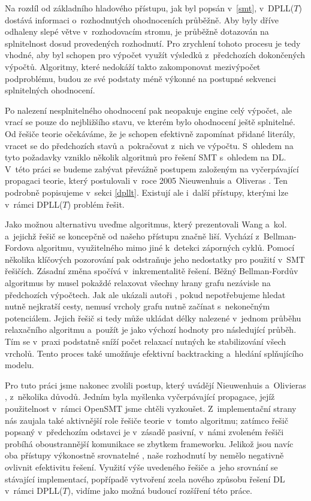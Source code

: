 Na rozdíl od základního hladového přístupu, jak byl popsán v~\ref{smt}, v~DPLL($T$) dostává \Solver informaci o~rozhodnutých ohodnoceních průběžně. Aby byly dříve odhaleny slepé větve v~rozhodovacím stromu, \Solver je průběžně dotazován na splnitelnost dosud provedených rozhodnutí. Pro zrychlení tohoto procesu je tedy vhodné, aby byl schopen pro výpočet využít výsledků z~předchozích dokončených výpočtů. Algoritmy, které nedokáží takto zakomponovat mezivýpočet podproblému, budou ze své podstaty méně výkonné na postupné sekvenci splnitelných ohodnocení.

Po nalezení nesplnitelného ohodnocení pak neopakuje engine celý výpočet, ale vrací se pouze do nejbližšího stavu, ve kterém bylo ohodnocení ještě splnitelné. Od řešiče teorie očekáváme, že je schopen efektivně zapomínat přidané literály, vracet se do předchozích stavů a~pokračovat z~nich ve výpočtu. %
S~ohledem na tyto požadavky vzniklo několik algoritmů pro řešení SMT s~ohledem na DL. V~této práci se budeme zabývat převážně postupem založeným na vyčerpávající propagaci teorie, který postulovali v~roce 2005 Nieuwenhuis a~Oliveras \cite{Nieuwenhuis05}. Ten podrobně popisujeme v~sekci \ref{dpllt}. Existují ale i~další přístupy, kterými lze v~rámci DPLL($T$) problém řešit.

Jako možnou alternativu uveďme algoritmus, který prezentovali Wang a~kol. \cite{Wang05} a~jejichž řešič se koncepčně od našeho přístupu značně liší. Vychází z~Bellman-Fordova algoritmu, využitelného mimo jiné k~detekci záporných cyklů. Pomocí několika klíčových pozorování pak odstraňuje jeho nedostatky pro použití v~SMT řešičích. Zásadní změna spočívá v~inkrementalitě řešení. Běžný Bellman-Fordův algoritmus by musel pokaždé relaxovat všechny hrany grafu nezávisle na předchozích výpočtech. Jak ale ukázali autoři \cite{Wang05}, pokud nepotřebujeme hledat nutně nejkratší cesty, nemusí vrcholy grafu nutně začínat s~nekonečným potenciálem. Jejich řešič si tedy může ukládat délky nalezené v~jednom průběhu relaxačního algoritmu a~použít je jako výchozí hodnoty pro následující průběh. Tím se v~praxi podstatně sníží počet relaxací nutných ke stabilizování všech vrcholů. Tento proces také umožňuje efektivní backtracking a~hledání splňujícího modelu.

Pro tuto práci jsme nakonec zvolili postup, který uvádějí Nieuwenhuis a~Olivieras \cite{Nieuwenhuis05}, z~několika důvodů. Jedním byla myšlenka vyčerpávající propagace, jejíž použitelnost v~rámci OpenSMT jsme chtěli vyzkoušet. Z~implementační strany nás zaujala také aktivnější role řešiče teorie v~tomto algoritmu; zatímco řešič popsaný v~předchozím odstavci je v~zásadě pasivní, v~námi zvoleném řešiči probíhá oboustrannější komunikace se zbytkem frameworku. Jelikož jsou navíc oba přístupy výkonostně srovnatelné \cite{Wang05}, naše rozhodnutí by nemělo negativně ovlivnit efektivitu řešení. Využití výše uvedeného řešiče a~jeho srovnání se stávající implementací, popřípadě vytvoření zcela nového způsobu řešení DL v~rámci DPLL($T$), vidíme jako možná budoucí rozšíření této práce.
